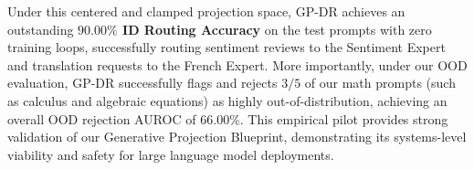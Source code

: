 Under this centered and clamped projection space, GP-DR achieves an outstanding \textbf{$90.00\%$ ID Routing Accuracy} on the test prompts with zero training loops, successfully routing sentiment reviews to the Sentiment Expert and translation requests to the French Expert. More importantly, under our OOD evaluation, GP-DR successfully flags and rejects $3/5$ of our math prompts (such as calculus and algebraic equations) as highly out-of-distribution, achieving an overall OOD rejection AUROC of \textbf{$66.00\%$}. This empirical pilot provides strong validation of our Generative Projection Blueprint, demonstrating its systems-level viability and safety for large language model deployments.